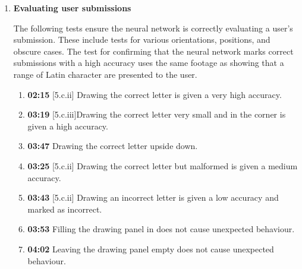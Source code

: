 \documentclass{article}
\begin{document}
\begin{enumerate}
    \item \textbf{Evaluating user submissions}
    
    The following tests ensure the neural network is correctly evaluating a user's submission. These include tests for various orientations, positions, and obscure cases. The test for confirming that the neural network marks correct submissions with a high accuracy uses the same footage as showing that a range of Latin character are presented to the user.

    \begin{enumerate}
        \item \textbf{02:15} [5.c.ii] Drawing the correct letter is given a very high accuracy. %
        \item \textbf{03:19} [5.c.iii]Drawing the correct letter very small and in the corner is given a high accuracy.
        \item \textbf{03:47} Drawing the correct letter upside down.
        \item \textbf{03:25} [5.c.ii] Drawing the correct letter but malformed is given a medium accuracy.
        \item \textbf{03:43} [5.c.ii] Drawing an incorrect letter is given a low accuracy and marked as incorrect.
        \item \textbf{03:53} Filling the drawing panel in does not cause unexpected behaviour.
        \item \textbf{04:02} Leaving the drawing panel empty does not cause unexpected behaviour.
    \end{enumerate}


\end{enumerate}
\end{document}

